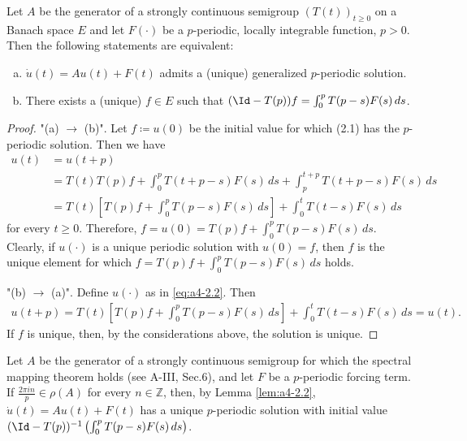 \begin{lemma}\label{lem:a4-2.2}
Let $A$ be the generator of a strongly continuous semigroup $(T(t))_{t \geq 0}$ on a Banach space $E$ and let $F(\cdot)$ be a $p$-periodic, locally integrable function, $p > 0$. 
Then the following statements are equivalent:
\begin{enumerate}[(a)]
\item $\dot{u}(t) = Au(t) + F(t)$ admits a (unique) generalized $p$-periodic solution.
\item There exists a (unique) $f \in E$ such that $(\Id - T(p))f = \int_{0}^{p} T(p-s)F(s) \, ds$.
\end{enumerate}
\end{lemma}

\begin{proof}
"(a) $\to$ (b)". 
Let $f \coloneqq u(0)$ be the initial value for which (2.1) has the $p$-periodic solution. 
Then we have
\begin{align*}
u(t) &= u(t+p) \\
&= T(t)T(p)f + \int_{0}^{p} T(t+p-s)F(s) \, ds + \int_{p}^{t+p} T(t+p-s)F(s) \, ds \\
&= T(t)\left[T(p)f + \int_{0}^{p} T(p-s)F(s) \, ds\right] + \int_{0}^{t} T(t-s)F(s) \, ds
\end{align*}
for every $t \geq 0$. 
Therefore, $f = u(0) = T(p)f + \int_{0}^{p} T(p-s)F(s) \, ds$.
Clearly, if $u(\cdot)$ is a unique periodic solution with $u(0) = f$, then $f$ is the unique element for which $f = T(p)f + \int_{0}^{p} T(p-s)F(s) \, ds$ holds.

\noindent
"(b) $\to$ (a)". 
Define $u(\cdot)$ as in \eqref{eq:a4-2.2}. 
Then
\begin{align*}
u(t+p) = T(t)\left[T(p)f + \int_{0}^{p} T(p-s)F(s) \, ds\right] + \int_{0}^{t} T(t-s)F(s) \, ds = u(t).
\end{align*}
If $f$ is unique, then, by the considerations above, the solution is unique.
\end{proof}

\begin{remark}\label{rem:a4-2.3}
Let $A$ be the generator of a strongly continuous semigroup for which the spectral mapping theorem holds (see A-III, Sec.6), and let $F$ be a $p$-periodic forcing term.
If $\frac{2\pi in}{p} \in \rho(A)$ for every $n \in \mathbb{Z}$, then, by Lemma \ref{lem:a4-2.2}, $\dot{u}(t) = Au(t) + F(t)$ has a unique $p$-periodic solution with initial value $(\Id - T(p))^{-1} \left(\int_{0}^{p} T(p-s)F(s) \, ds\right)$.
\end{remark}

